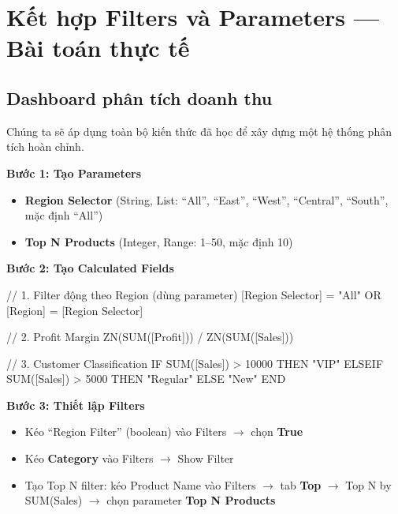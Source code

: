 \documentclass[12pt]{article}
\begin{document}
\section{Kết hợp Filters và Parameters --- Bài toán thực tế}
\label{section:combined}

\subsection{Dashboard phân tích doanh thu}

\noindent Chúng ta sẽ áp dụng toàn bộ kiến thức đã học để xây dựng một hệ thống phân tích hoàn chỉnh.

\noindent \textbf{Bước 1: Tạo Parameters}

\begin{itemize}[nosep]
    \item \textbf{Region Selector} (String, List: ``All'', ``East'', ``West'', ``Central'', ``South'', mặc định ``All'')
    \item \textbf{Top N Products} (Integer, Range: 1--50, mặc định 10)
\end{itemize}

\noindent \textbf{Bước 2: Tạo Calculated Fields}

\begin{aivncodebox}[]
\begin{python}
// 1. Filter động theo Region (dùng parameter)
[Region Selector] = "All" OR [Region] = [Region Selector]

// 2. Profit Margin
ZN(SUM([Profit])) / ZN(SUM([Sales]))

// 3. Customer Classification
IF SUM([Sales]) > 10000 THEN "VIP"
ELSEIF SUM([Sales]) > 5000 THEN "Regular"
ELSE "New"
END
\end{python}
\end{aivncodebox}

\noindent \textbf{Bước 3: Thiết lập Filters}

\begin{itemize}[nosep]
    \item Kéo ``Region Filter'' (boolean) vào Filters $\rightarrow$ chọn \textbf{True}
    \item Kéo \textbf{Category} vào Filters $\rightarrow$ Show Filter
    \item Tạo Top N filter: kéo Product Name vào Filters $\rightarrow$ tab \textbf{Top} $\rightarrow$ Top N by SUM(Sales) $\rightarrow$ chọn parameter \textbf{Top N Products}
\end{itemize}
\end{document}
